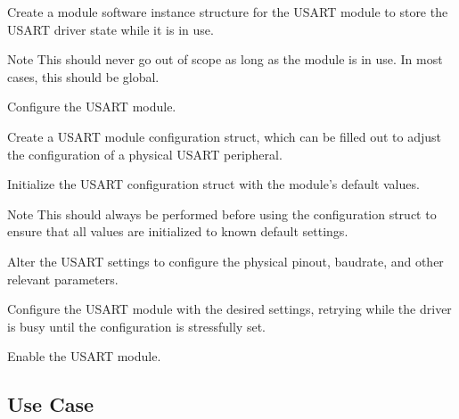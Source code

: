 \begin{DoxyEnumerate}
\item Create a module software instance structure for the U\+S\+A\+R\+T module to store the U\+S\+A\+R\+T driver state while it is in use. 
\begin{DoxyCodeInclude}
\end{DoxyCodeInclude}
 \begin{DoxyNote}{Note}
This should never go out of scope as long as the module is in use. In most cases, this should be global.
\end{DoxyNote}

\item Configure the U\+S\+A\+R\+T module.
\begin{DoxyEnumerate}
\item Create a U\+S\+A\+R\+T module configuration struct, which can be filled out to adjust the configuration of a physical U\+S\+A\+R\+T peripheral. 
\begin{DoxyCodeInclude}
\end{DoxyCodeInclude}

\item Initialize the U\+S\+A\+R\+T configuration struct with the module's default values. 
\begin{DoxyCodeInclude}
\end{DoxyCodeInclude}
 \begin{DoxyNote}{Note}
This should always be performed before using the configuration struct to ensure that all values are initialized to known default settings.
\end{DoxyNote}

\item Alter the U\+S\+A\+R\+T settings to configure the physical pinout, baudrate, and other relevant parameters. 
\begin{DoxyCodeInclude}
\end{DoxyCodeInclude}

\item Configure the U\+S\+A\+R\+T module with the desired settings, retrying while the driver is busy until the configuration is stressfully set. 
\begin{DoxyCodeInclude}
\end{DoxyCodeInclude}

\item Enable the U\+S\+A\+R\+T module. 
\begin{DoxyCodeInclude}
\end{DoxyCodeInclude}

\end{DoxyEnumerate}
\end{DoxyEnumerate}\hypertarget{asfdoc_sam0_sercom_usart_basic_use_case_asfdoc_sam0_usart_basic_use_case_main}{}\subsection{Use Case}\label{asfdoc_sam0_sercom_usart_basic_use_case_asfdoc_sam0_usart_basic_use_case_main}
